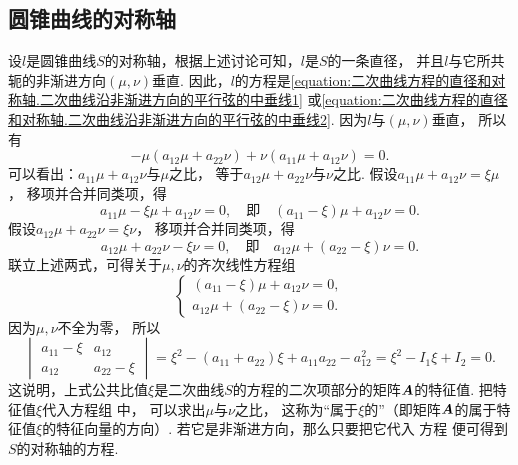\subsection{圆锥曲线的对称轴}
设\(l\)是圆锥曲线\(S\)的对称轴，根据上述讨论可知，\(l\)是\(S\)的一条直径，
并且\(l\)与它所共轭的非渐进方向\((\mu,\nu)\)垂直.
因此，\(l\)的方程是\cref{equation:二次曲线方程的直径和对称轴.二次曲线沿非渐进方向的平行弦的中垂线1}
或\cref{equation:二次曲线方程的直径和对称轴.二次曲线沿非渐进方向的平行弦的中垂线2}.
因为\(l\)与\((\mu,\nu)\)垂直，
所以有\begin{equation}\label{equation:二次曲线方程的直径和对称轴.非渐进方向及其共轭直径的垂直关系}
	-\mu (a_{12} \mu + a_{22} \nu) + \nu (a_{11} \mu + a_{12} \nu) = 0.
\end{equation}
可以看出：\(a_{11} \mu + a_{12} \nu\)与\(\mu\)之比，
等于\(a_{12} \mu + a_{22} \nu\)与\(\nu\)之比.
假设\(a_{11} \mu + a_{12} \nu = \xi \mu\)，
移项并合并同类项，得\begin{equation*}
	a_{11} \mu - \xi \mu + a_{12} \nu = 0,
	\quad\text{即}\quad
	(a_{11} - \xi) \mu + a_{12} \nu = 0.
\end{equation*}
假设\(a_{12} \mu + a_{22} \nu = \xi \nu\)，
移项并合并同类项，得\begin{equation*}
	a_{12} \mu + a_{22} \nu - \xi \nu = 0,
	\quad\text{即}\quad
	a_{12} \mu + (a_{22} - \xi) \nu = 0.
\end{equation*}
联立上述两式，可得关于\(\mu,\nu\)的齐次线性方程组\begin{equation}\label{equation:二次曲线方程的直径和对称轴.属于特征值的主方向}
	\left\{ \begin{array}{l}
		(a_{11} - \xi) \mu + a_{12} \nu = 0, \\
		a_{12} \mu + (a_{22} - \xi) \nu = 0.
	\end{array} \right.
\end{equation}
因为\(\mu,\nu\)不全为零，
所以\begin{equation*}
	\begin{vmatrix}
		a_{11} - \xi & a_{12} \\
		a_{12} & a_{22} - \xi
	\end{vmatrix}
	= \xi^2 - (a_{11} + a_{22}) \xi + a_{11} a_{22} - a_{12}^2
	= \xi^2 - I_1 \xi + I_2
	= 0.
\end{equation*}
这说明，上式公共比值\(\xi\)是二次曲线\(S\)的方程的二次项部分的矩阵\(\boldsymbol{A}\)的特征值.
把特征值\(\xi\)代入方程组  中，
可以求出\(\mu\)与\(\nu\)之比，
这称为“属于\(\xi\)的”（即矩阵\(\boldsymbol{A}\)的属于特征值\(\xi\)的特征向量的方向）.
若它是非渐进方向，那么只要把它代入
方程 
便可得到\(S\)的对称轴的方程.

